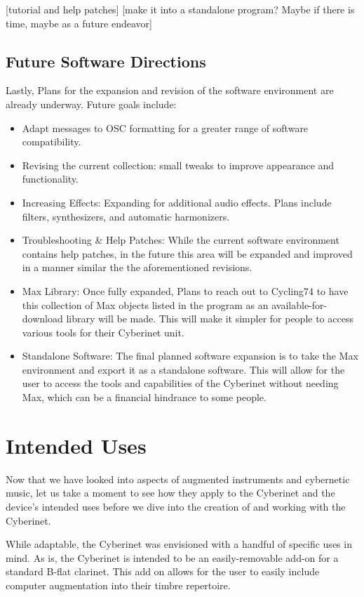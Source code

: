 [tutorial and help patches]
[make it into a standalone program? Maybe if there is time, maybe as a future endeavor]


\section{Future Software Directions}
Lastly, Plans for the expansion and revision of the software environment are already underway. Future goals include:
\begin{itemize}
    \item Adapt messages to OSC formatting for a greater range of software compatibility.
    \item Revising the current collection: small tweaks to improve appearance and functionality.
    \item Increasing Effects: Expanding for additional audio effects. Plans include filters, synthesizers, and automatic harmonizers.
    \item Troubleshooting \& Help Patches: While the current software environment contains help patches, in the future this area will be expanded and improved in a manner similar the the aforementioned revisions.
    \item Max Library: Once fully expanded, Plans to reach out to Cycling74 to have this collection of Max objects listed in the program as an available-for-download library will be made. This will make it simpler for people to access various tools for their Cyberinet unit.
    \item Standalone Software: The final planned software expansion is to take the Max environment and export it as a standalone software. This will allow for the user to access the tools and capabilities of the Cyberinet without needing Max, which can be a financial hindrance to some people.
\end{itemize}

\chapter{Intended Uses} %
Now that we have looked into aspects of augmented instruments and cybernetic music, let us take a moment to see how they apply to the Cyberinet and the device's intended uses before we dive into the creation of and working with the Cyberinet.

While adaptable, the Cyberinet was envisioned with a handful of specific uses in mind. As is, the Cyberinet is intended to be an easily-removable add-on for a standard B-flat clarinet. This add on allows for the user to easily include computer augmentation into their timbre repertoire. 

